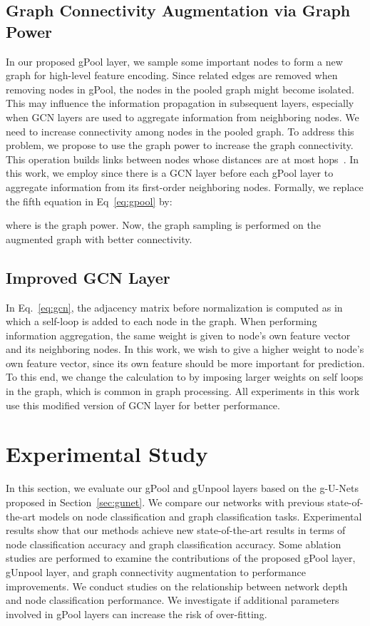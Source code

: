 \documentclass{article}
\begin{document}
\subsection{Graph Connectivity Augmentation via Graph Power}\label{sec:aug}

In our proposed gPool layer, we sample some important nodes to form
a new graph for high-level feature encoding. Since related edges are
removed when removing nodes in gPool, the nodes in the pooled graph
might become isolated. This may influence the information
propagation in subsequent layers, especially when GCN layers are
used to aggregate information from neighboring nodes. We need to
increase connectivity among nodes in the pooled graph. To address
this problem, we propose to use the  graph power
 to increase the graph connectivity. This operation
builds links between nodes whose distances are at most 
hops~\citep{chepuri2016subsampling}. In this work, we employ 
since there is a GCN layer before each gPool layer to aggregate
information from its first-order neighboring nodes. Formally, we
replace the fifth equation in Eq~\ref{eq:gpool} by:

where  is the  graph power.
Now, the graph sampling is performed on the augmented graph with
better connectivity.



\subsection{Improved GCN Layer}

In Eq.~\ref{eq:gcn}, the adjacency matrix before normalization is
computed as  in which a self-loop is added to each
node in the graph. When performing information aggregation, the same
weight is given to node's own feature vector and its neighboring
nodes. In this work, we wish to give a higher weight to node's own
feature vector, since its own feature should be more important for
prediction. To this end, we change the calculation to  by imposing larger weights on self loops in the graph, which is
common in graph processing. All experiments in this work use this
modified version of GCN layer for better performance.


\section{Experimental Study}

In this section, we evaluate our gPool and gUnpool layers based on
the g-U-Nets proposed in Section~\ref{sec:gunet}. We compare our
networks with previous state-of-the-art models on node
classification and graph classification tasks.
Experimental results show that our methods achieve new
state-of-the-art results in terms of node classification accuracy
and graph classification accuracy. Some ablation
studies are performed to examine the contributions of the proposed
gPool layer, gUnpool layer, and graph connectivity augmentation to
performance improvements. We conduct studies on the relationship
between network depth and node classification performance. We
investigate if additional parameters involved in gPool layers can
increase the risk of over-fitting.
\end{document}
